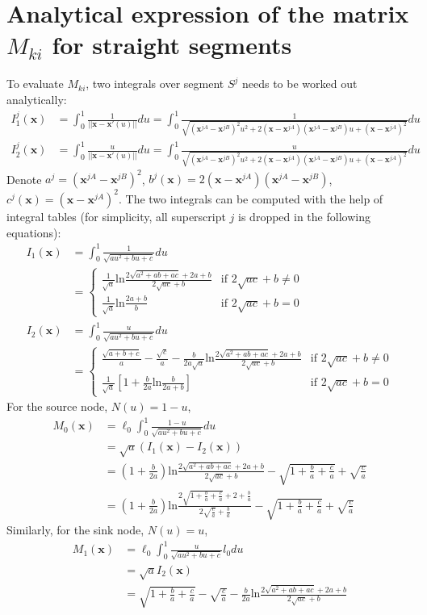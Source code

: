 \section{Analytical expression of the matrix $M_{ki}$\label{ap1} for straight segments}
To evaluate $M_{ki}$, two integrals over segment $S^j$ needs to be worked out analytically:
\begin{align}
I_1^j(\bm x)&=\int_0^1\frac{1}{||\bm x- \bm x'(u)||} du=\int_0^1\frac{1}{\sqrt{(\bm x^{jA} - \bm x^{jB})^2u^2+2(\bm x - \bm x^{jA})(\bm x^{jA}-\bm x^{jB})u+(\bm x - \bm x^{jA})^2}}du\\
I_2^j(\bm x)&=\int_0^1\frac{u}{||\bm x- \bm x'(u)||} du=\int_0^1\frac{u}{\sqrt{(\bm x^{jA} - \bm x^{jB})^2u^2+2(\bm x - \bm x^{jA})(\bm x^{jA}-\bm x^{jB})u+(\bm x - \bm x^{jA})^2}}du
\end{align}
Denote $a^j=(\bm x^{jA}-\bm x^{jB})^2$, $b^j(\bm x)=2(\bm x - \bm x^{jA})(\bm x^{jA}- \bm x^{jB})$, $c^j(\bm x)=(\bm x - \bm x^{jA})^2$. The two integrals can be computed with the help of integral tables (for simplicity, all superscript $j$ is dropped in the following equations):
\begin{align}
I_1(\bm x)&=\int^1_0\frac{1}{\sqrt{au^2+bu+c}}du\\
&=
\begin{cases}
\frac{1}{\sqrt{a}}\text{ln}\frac{2\sqrt{a^2+ab+ac}+2a+b}{2\sqrt{ac}+b}  & \text{if } 2\sqrt{ac}+b \ne 0\\
\frac{1}{\sqrt{a}}\text{ln}\frac{2a+b}{b} & \text{if } 2\sqrt{ac}+b = 0
\end{cases}
\\
I_2(\bm x)&=\int^1_0\frac{u}{\sqrt{au^2+bu+c}}du\\
&=
\begin{cases}
\frac{\sqrt{a+b+c}}{a}-\frac{\sqrt{c}}{a}-\frac{b}{2a\sqrt{a}}\text{ln}\frac{2\sqrt{a^2+ab+ac}+2a+b}{2\sqrt{ac}+b}  & \text{if } 2\sqrt{ac}+b \ne 0\\
\frac{1}{\sqrt{a}}\left[1+\frac{b}{2a}\text{ln}\frac{b}{2a+b}\right] & \text{if } 2\sqrt{ac}+b = 0
\end{cases}
\end{align}
For the source node, $N(u)=1-u$,
\begin{align}
M_0(\bm x) &= \ell_0\int_0^1\frac{1-u}{\sqrt{au^2+bu+c}}du\\
		   &=\sqrt{a}(I_1(\bm x) - I_2(\bm x))\\
		   &=(1+\frac{b}{2a})\text{ln}\frac{2\sqrt{a^2+ab+ac}+2a+b}{2\sqrt{ac}+b}
		   	-\sqrt{1+\frac{b}{a}+\frac{c}{a}} + \sqrt{\frac{c}{a}}\\
		  &=(1+\frac{b}{2a})\text{ln}\frac{2\sqrt{1+\frac{b}{a}+\frac{c}{a}}+2+\frac{b}{a}}{2\sqrt{\frac{c}{a}}+\frac{b}{a}}
		   	-\sqrt{1+\frac{b}{a}+\frac{c}{a}} + \sqrt{\frac{c}{a}}
\end{align}
Similarly, for the sink node, $N(u)=u$,
\begin{align}
M_1(\bm x) &= \ell_0\int_0^1\frac{u}{\sqrt{au^2+bu+c}}l_0 du\\
		  &=\sqrt{a}I_2(\bm x)\\
		  &=\sqrt{1+\frac{b}{a}+\frac{c}{a}}-\sqrt{\frac{c}{a}}
		   	-\frac{b}{2a}\text{ln}\frac{2\sqrt{a^2+ab+ac}+2a+b}{2\sqrt{ac}+b}
\end{align}







